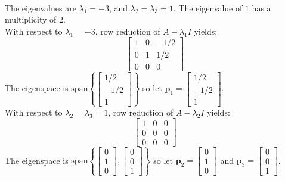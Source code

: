 \documentclass{article}
\begin{document}
\begin{itemize}
\begin{align*}
\end{align*}
The eigenvalues are \(\lambda_1 = -3\), and \(\lambda_2 = \lambda_3 = 1\). The eigenvalue of \(1\) has a multiplicity of \(2\). \\
With respect to \(\lambda_1 = -3\), row reduction of \(A - \lambda_1 I\) yields: 
\[\begin{bmatrix} 
1 & 0 & -1/2 \\ 
0 & 1 & 1/2 \\
0 & 0 & 0 
\end{bmatrix}\]
The eigenspace is \(\text{span}\left\{\begin{bmatrix} 1/2 \\ -1/2 \\ 1 \end{bmatrix}\right\}\) so let \(\mathbf{p}_1 = \begin{bmatrix} 1/2 \\ -1/2 \\ 1 \end{bmatrix}\). \\
With respect to \(\lambda_2 = \lambda_3 = 1\), row reduction of \(A - \lambda_2 I\) yields: 
\[\begin{bmatrix} 
1 & 0 & 0 \\ 
0 & 0 & 0 \\
0 & 0 & 0 
\end{bmatrix}\]
The eigenspace is \(\text{span}\left\{\begin{bmatrix} 0 \\ 1 \\ 0 \end{bmatrix}, \begin{bmatrix} 0 \\ 0 \\ 1 \end{bmatrix}\right\}\) so let \(\mathbf{p}_2 = \begin{bmatrix} 0 \\ 1 \\ 0 \end{bmatrix}\) and \(\mathbf{p}_3 = \begin{bmatrix} 0 \\ 0 \\ 1 \end{bmatrix}\). \\ 

\end{itemize}
\end{document}
